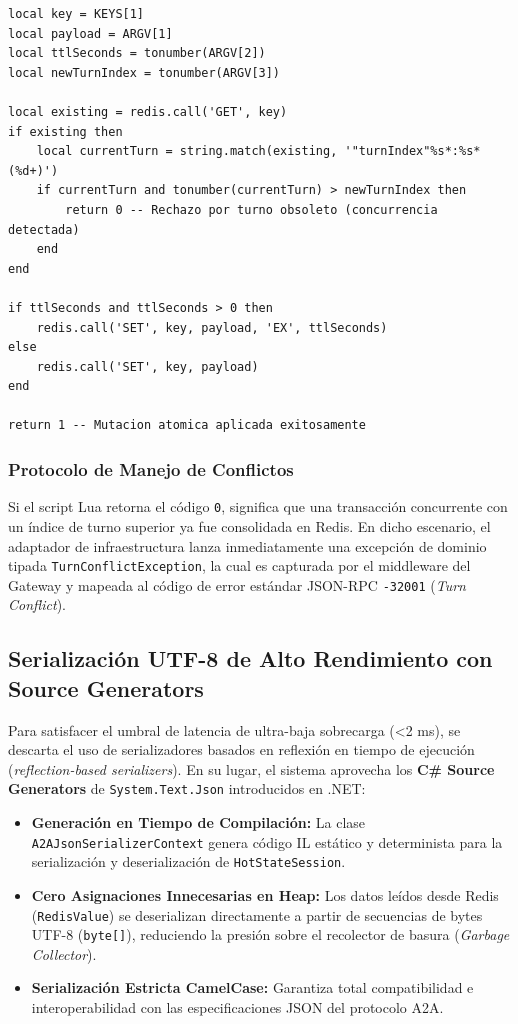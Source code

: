 \begin{lstlisting}[language={[ANSI]C}, caption={Script Lua para mutación atómica y protección monótona de turnos.}]
local key = KEYS[1]
local payload = ARGV[1]
local ttlSeconds = tonumber(ARGV[2])
local newTurnIndex = tonumber(ARGV[3])

local existing = redis.call('GET', key)
if existing then
    local currentTurn = string.match(existing, '"turnIndex"%s*:%s*(%d+)')
    if currentTurn and tonumber(currentTurn) > newTurnIndex then
        return 0 -- Rechazo por turno obsoleto (concurrencia detectada)
    end
end

if ttlSeconds and ttlSeconds > 0 then
    redis.call('SET', key, payload, 'EX', ttlSeconds)
else
    redis.call('SET', key, payload)
end

return 1 -- Mutacion atomica aplicada exitosamente
\end{lstlisting}

\subsubsection{Protocolo de Manejo de Conflictos}
Si el script Lua retorna el código \texttt{0}, significa que una transacción concurrente con un índice de turno superior ya fue consolidada en Redis. En dicho escenario, el adaptador de infraestructura lanza inmediatamente una excepción de dominio tipada \texttt{TurnConflictException}, la cual es capturada por el middleware del Gateway y mapeada al código de error estándar JSON-RPC \texttt{-32001} (\textit{Turn Conflict}).

\subsection{Serialización UTF-8 de Alto Rendimiento con Source Generators}
Para satisfacer el umbral de latencia de ultra-baja sobrecarga (<2 ms), se descarta el uso de serializadores basados en reflexión en tiempo de ejecución (\textit{reflection-based serializers}). En su lugar, el sistema aprovecha los \textbf{C\# Source Generators} de \texttt{System.Text.Json} introducidos en .NET:

\begin{itemize}
    \item \textbf{Generación en Tiempo de Compilación:} La clase \texttt{A2AJsonSerializerContext} genera código IL estático y determinista para la serialización y deserialización de \texttt{HotStateSession}.
    \item \textbf{Cero Asignaciones Innecesarias en Heap:} Los datos leídos desde Redis (\texttt{RedisValue}) se deserializan directamente a partir de secuencias de bytes UTF-8 (\texttt{byte[]}), reduciendo la presión sobre el recolector de basura (\textit{Garbage Collector}).
    \item \textbf{Serialización Estricta CamelCase:} Garantiza total compatibilidad e interoperabilidad con las especificaciones JSON del protocolo A2A.
\end{itemize}

